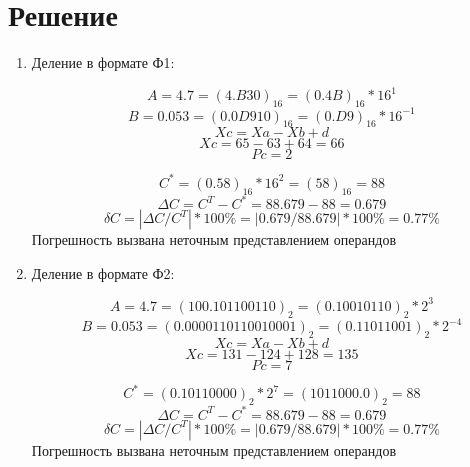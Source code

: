 \documentclass{article}
\begin{document}
\section{Решение}
\begin{enumerate}
       \item Деление в формате Ф1:

$$ A = 4.7 = (4.B30)_{16} = (0.4B)_{16} * 16^1 $$
$$ B = 0.053 = (0.0D910)_{16} = (0.D9)_{16} * 16^{-1} $$
$$ Xc = Xa - Xb + d $$
$$ Xc = 65 - 63 + 64 = 66 $$
$$ Pc = 2 $$


$$ C^* = (0.58)_{16} * 16^2 = (58)_{16} = 88 $$
$$ \Delta C = C^T - C^* = 88.679 - 88 = 0.679 $$
$$ δC = |\Delta C/C^T| * 100\% = |0.679/88.679| * 100\% = 0.77\% $$
Погрешность вызвана неточным представлением операндов

\item Деление в формате Ф2:

$$ A = 4.7 = (100.101100110)_2 = (0.10010110)_2 * 2^3 $$
$$ B = 0.053 = (0.0000110110010001)_2 = (0.11011001)_2 * 2^{-4} $$
$$ Xc = Xa - Xb + d $$
$$ Xc = 131 - 124 + 128 = 135 $$
$$ Pc = 7 $$


$$ C^* = (0.10110000)_2 * 2^7 = (1011000.0)_2 = 88 $$
$$ \Delta C = C^T - C^* = 88.679 - 88 = 0.679 $$
$$ δC = |\Delta C/C^T| * 100\% = |0.679/88.679| * 100\% = 0.77\% $$
Погрешность вызвана неточным представлением операндов

\end{enumerate}
\end{document}
